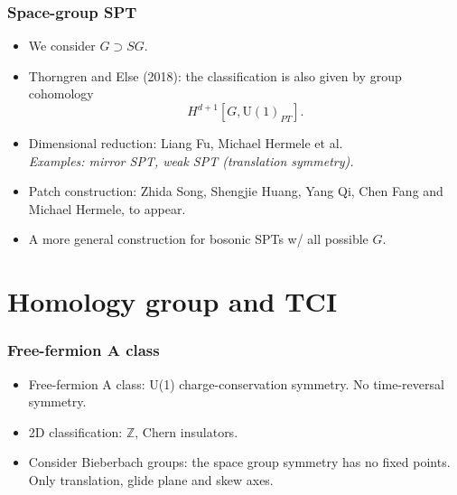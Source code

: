 \documentclass[xcolor=table, 10pt, aspectratio=43]{beamer}
\newcommand{\uone}{\mathrm U(1)}
\begin{document}
\begin{frame}
\frametitle{Space-group SPT}
\begin{itemize}
\item We consider $G\supset SG$.
\item Thorngren and Else (2018): the classification is also given by group cohomology
\[H^{d+1}[G, \uone_{PT}].\]
\item Dimensional reduction: Liang Fu, Michael Hermele et al.\\
\emph{Examples: mirror SPT, weak SPT (translation symmetry).}
\item Patch construction: Zhida Song, Shengjie Huang, Yang Qi, Chen Fang and Michael Hermele, to appear.
\item A more general construction for bosonic SPTs w/ all possible $G$.
\end{itemize}
\begin{center}
\hspace{2em}
\end{center}
\end{frame}

\section{Homology group and TCI}

\begin{frame}
\frametitle{Free-fermion A class}
\begin{itemize}
\item Free-fermion A class: U(1) charge-conservation symmetry. No time-reversal symmetry.
\item 2D classification: $\mathbb Z$, Chern insulators.
\item Consider Bieberbach groups: the space group symmetry has no fixed points.\\
Only translation, glide plane and skew axes.
\end{itemize}
\end{frame}
\end{document}
